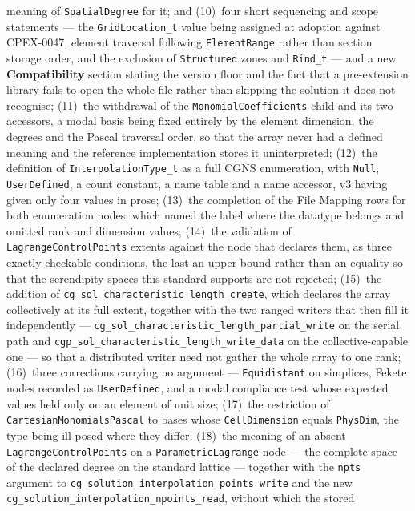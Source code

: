 \documentclass[11pt,letterpaper]{article}
\newif\ifvfourdraft
\newenvironment{v4block}{\ifvfourdraft\color{v4violet}\fi\ignorespaces}{\par}
\begin{document}
{\begin{v4block}
\begin{motionbox}
meaning of \texttt{SpatialDegree} for it; and (10)~four short sequencing and scope
statements --- the \texttt{GridLocation\_t} value being assigned at adoption
against CPEX-0047, element traversal following \texttt{ElementRange} rather than
section storage order, and the exclusion of \texttt{Structured} zones and
\texttt{Rind\_t} --- and a new \textbf{Compatibility} section stating the version
floor and the fact that a pre-extension library fails to open the whole file
rather than skipping the solution it does not recognise; (11)~the withdrawal of
the \texttt{MonomialCoefficients} child and its two accessors, a modal basis
being fixed entirely by the element dimension, the degrees and the Pascal
traversal order, so that the array never had a defined meaning and the reference
implementation stores it uninterpreted; (12)~the definition of
\texttt{InterpolationType\_t} as a full CGNS enumeration, with \texttt{Null},
\texttt{UserDefined}, a count constant, a name table and a name accessor, v3
having given only four values in prose; (13)~the completion of the File Mapping
rows for both enumeration nodes, which named the label where the datatype belongs
and omitted rank and dimension values; (14)~the validation of
\texttt{LagrangeControlPoints} extents against the node that declares them, as
three exactly-checkable conditions, the last an upper bound rather than an
equality so that the serendipity spaces this standard supports are not rejected;
(15)~the addition of
\texttt{cg\_sol\_characteristic\_length\_create}, which declares the array
collectively at its full extent, together with the two ranged writers that then
fill it independently ---
\texttt{cg\_sol\_characteristic\_length\_partial\_write} on the serial path and
\texttt{cgp\_sol\_characteristic\_length\_write\_data} on the collective-capable
one --- so that a distributed writer need not gather the whole array to one
rank;
(16)~three corrections carrying no
argument --- \texttt{Equidistant} on simplices, Fekete nodes recorded as
\texttt{UserDefined}, and a modal compliance test whose expected values held only
on an element of unit size; (17)~the restriction of
\texttt{CartesianMonomialsPascal} to bases whose \texttt{CellDimension} equals
\texttt{PhysDim}, the type being ill-posed where they differ; (18)~the meaning of an absent
\texttt{LagrangeControlPoints} on a \texttt{ParametricLagrange} node --- the
complete space of the declared degree on the standard lattice --- together with
the \texttt{npts} argument to
\texttt{cg\_solution\_interpolation\_points\_write} and the new
\texttt{cg\_solution\_interpolation\_npoints\_read}, without which the stored

\end{motionbox}
\end{v4block}}
\end{document}
